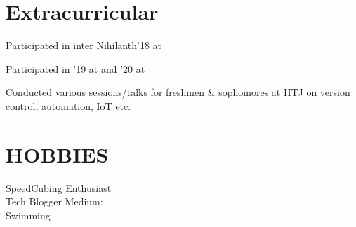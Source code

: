 \documentclass[]{deedy-resume-openfont}
\begin{document}
\begin{minipage}[t]{0.67\textwidth}
\section{Extracurricular} 
\begin{bulletedlist}
\item Participated in inter  Nihilanth'18 at 
\item Participated in  '19 at  and '20 at 
\item Conducted various sessions/talks for freshmen \& sophomores at IITJ on version control, automation, IoT etc.

\end{bulletedlist}

\end{minipage}
\hfill
\begin{minipage}[t]{0.30\textwidth} 


\section{HOBBIES}
\textbullet{} SpeedCubing Enthusiast  \\
\textbullet{} Tech Blogger Medium:  \href{https://medium.com/@anshul.ahu/}{} \\
\textbullet{} Swimming 
\sectionsep


\end{minipage} 
\end{document}
